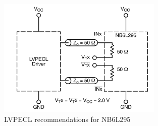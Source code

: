 \begin{figure}[tbh]
	\centering
	\includegraphics[width = 0.7\textwidth]{chap/04-theresa/img/delay_lvpecl}
	\caption[NB6L295 Delay Chip Schematic]{LVPECL recommendations for NB6L295 \cite{NB6L295}}
	\label{fig:delay_lvpecl}
\end{figure}



